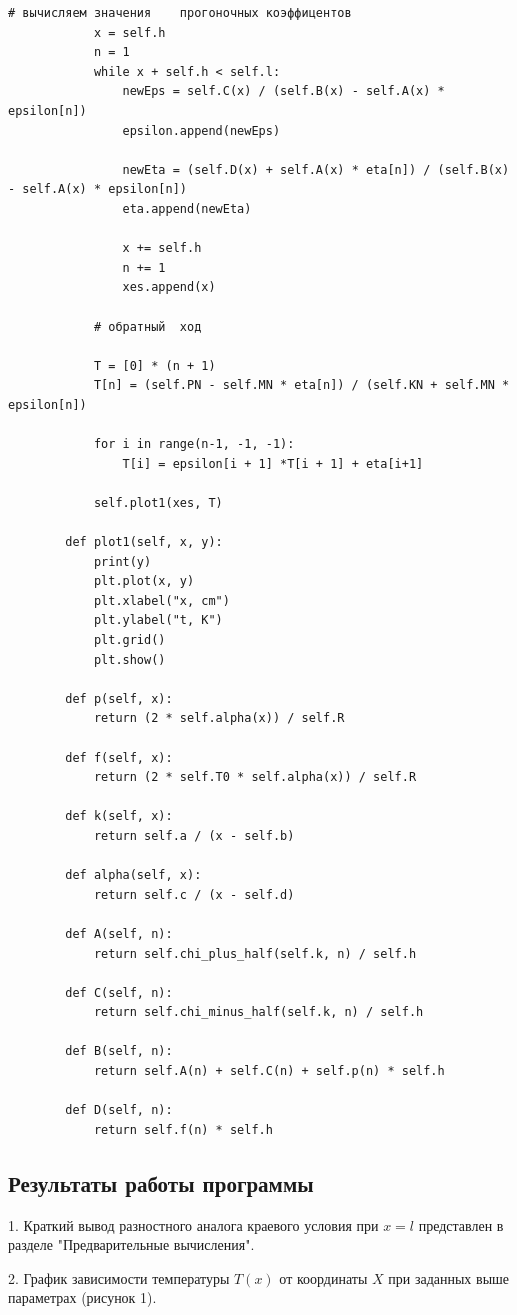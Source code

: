 \documentclass[a4paper,14pt]{article}
\begin{document}
\begin{lstlisting}[label=code1,caption=\text{Класс Modeller.}]
			# вычисляем	значения	прогоночных	коэффицентов
			x = self.h
			n = 1
			while x + self.h < self.l:
				newEps = self.C(x) / (self.B(x) - self.A(x) * epsilon[n])
				epsilon.append(newEps)
	
				newEta = (self.D(x) + self.A(x) * eta[n]) / (self.B(x) - self.A(x) * epsilon[n])
				eta.append(newEta)
	
				x += self.h
				n += 1
				xes.append(x)
	
			# обратный	ход
	
			T = [0] * (n + 1)
			T[n] = (self.PN - self.MN * eta[n]) / (self.KN + self.MN * epsilon[n])
	
			for i in range(n-1, -1, -1):
				T[i] = epsilon[i + 1] *T[i + 1] + eta[i+1]
	
			self.plot1(xes, T)
	
		def plot1(self, x, y):
			print(y)
			plt.plot(x, y)
			plt.xlabel("x, cm")
			plt.ylabel("t, K")
			plt.grid()
			plt.show()
		
		def p(self, x):
			return (2 * self.alpha(x)) / self.R
	
		def f(self, x):
			return (2 * self.T0 * self.alpha(x)) / self.R
	
		def k(self, x):
			return self.a / (x - self.b)
	
		def alpha(self, x):
			return self.c / (x - self.d)
	
		def A(self, n):
			return self.chi_plus_half(self.k, n) / self.h
	
		def C(self, n):
			return self.chi_minus_half(self.k, n) / self.h
	
		def B(self, n):
			return self.A(n) + self.C(n) + self.p(n) * self.h
	
		def D(self, n):
			return self.f(n) * self.h	
\end{lstlisting}

\newpage
\subsection*{Результаты работы программы}

1. Краткий вывод разностного аналога краевого условия
при $x = l$ представлен в разделе "Предварительные вычисления".

2. График зависимости температуры $T(x)$ от координаты $X$ при заданных выше параметрах (рисунок 1).
\end{document}
